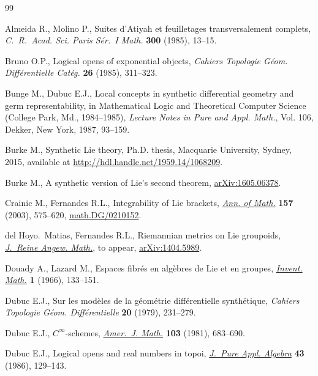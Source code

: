 \begin{thebibliography}{99}
\footnotesize\itemsep=0pt

Almeida R., Molino P., Suites d'{A}tiyah et feuilletages transversalement
 complets, \textit{C.~R.~Acad. Sci. Paris S\'er.~I Math.} \textbf{300} (1985),
 13--15.

Bruno O.P., Logical opens of exponential objects, \textit{Cahiers Topologie
 G\'eom. Diff\'erentielle Cat\'eg.} \textbf{26} (1985), 311--323.

Bunge M., Dubuc E.J., Local concepts in synthetic dif\/ferential geometry and
 germ representability, in Mathematical Logic and Theoretical Computer Science
 ({C}ollege {P}ark, {M}d., 1984--1985), \textit{Lecture Notes in Pure and
 Appl. Math.}, Vol. 106, Dekker, New York, 1987, 93--159.

Burke M., Synthetic {L}ie theory, Ph.D. thesis, Macquarie University, Sydney,
 2015, {a}vailable at \url{http://hdl.handle.net/1959.14/1068209}.

Burke M., A synthetic version of {L}ie's second theorem, \href{http://arxiv.org/abs/1605.06378}{arXiv:1605.06378}.

Crainic M., Fernandes R.L., Integrability of {L}ie brackets, \href{https://doi.org/10.4007/annals.2003.157.575}{\textit{Ann. of
 Math.}} \textbf{157} (2003), 575--620, \href{http://arxiv.org/abs/math.DG/0210152}{math.DG/0210152}.

del Hoyo.~Matias, Fernandes R.L., Riemannian metrics on {L}ie groupoids,
 \href{https://doi.org/10.1515/crelle-2015-0018}{\textit{J.~Reine Angew. Math.}}, {t}o appear, \href{http://arxiv.org/abs/1404.5989}{arXiv:1404.5989}.

Douady A., Lazard M., Espaces f\/ibr\'es en alg\`ebres de {L}ie et en groupes,
 \href{https://doi.org/10.1007/BF01389725}{\textit{Invent. Math.}} \textbf{1} (1966), 133--151.

Dubuc E.J., Sur les mod\`eles de la g\'eom\'etrie dif\/f\'erentielle
 synth\'etique, \textit{Cahiers Topologie G\'eom. Diff\'erentielle}
 \textbf{20} (1979), 231--279.

Dubuc E.J., {$C^{\infty }$}-schemes, \href{https://doi.org/10.2307/2374046}{\textit{Amer.~J. Math.}} \textbf{103}
 (1981), 683--690.

Dubuc E.J., Logical opens and real numbers in topoi, \href{https://doi.org/10.1016/0022-4049(86)90091-5}{\textit{J.~Pure Appl.
 Algebra}} \textbf{43} (1986), 129--143.


\end{thebibliography}
